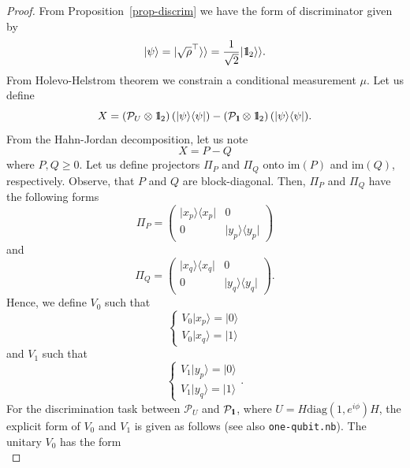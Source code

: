 \documentclass[preprint,12pt, a4paper]{elsarticle}
\newcommand{\ket}[1]{\ensuremath{|#1\rangle}}
\newcommand{\bra}[1]{\ensuremath{\langle#1|}}
\newcommand{\ketbra}[2]{\ensuremath{\ket{#1}\bra{#2}}}
\newcommand{\proj}[1]{\ensuremath{\ketbra{#1}{#1}}}
\newcommand{\1}{{\rm 1\hspace{-0.9mm}l}}
\newcommand{\Id}{{\rm 1\hspace{-0.9mm}l}}
\newcommand{\PP}{\mathcal{P}}
\newcommand{\diag}{\mathrm{diag}}
\begin{document}
\begin{proof}
From Proposition~\ref{prop-discrim} we have the form of discriminator given by
\begin{equation}
\ket{\psi} = | \sqrt{\rho}^\top \rangle \rangle = \frac{1}{\sqrt{2}} |\Id_2 
\rangle \rangle. 
\end{equation}
From Holevo-Helstrom theorem  we constrain a conditional measurement $\mu$.  
Let us define 
\begin{equation}
X  = \left( \PP_U \otimes \Id_2 \right)(\proj{\psi}) -  \left( \PP_\Id 
\otimes \Id_2 \right)(\proj{\psi}).
\end{equation} 
From the Hahn-Jordan decomposition, let us note
\begin{equation}
X = P - Q
\end{equation}
where $P, Q \ge 0 $. 
Let us define projectors $\Pi_P$ and $\Pi_Q$ onto  $\text{im}(P)$ and $\text{im}(Q)$, 
respectively. Observe, that $P $ and $Q$ are block-diagonal.  Then,  $\Pi_P$ and $\Pi_Q$ have the following forms
\begin{equation}
\Pi_P = \left(\begin{array}{cc}\proj{x_p}&0\\0&\proj{y_p}\end{array}\right) 
\end{equation}
and 
\begin{equation}
\Pi_Q = \left(\begin{array}{cc}\proj{x_q}&0\\0&\proj{y_q}\end{array}\right). 
\end{equation}
Hence, we define $V_0$ such that
\begin{equation}
\begin{cases} V_0 \ket{x_p} = \ket{0} \\ V_0 \ket{x_q} = \ket{1} \end{cases}
\end{equation}
and $V_1$ such that
\begin{equation}
\begin{cases} 
V_1 \ket{y_p} = \ket{0} \\ 
V_1 \ket{y_q} = \ket{1}
\end{cases}. 
\end{equation}
For the discrimination task between $\PP_{U}$ and $\PP_{\Id}$, where $U = H 
\diag(1, e^{i \phi })H$, the explicit form of $V_0$ and $V_1$ is given as 
follows (see also \texttt{one-qubit.nb}).
The unitary $V_0$ has the form
\begin{equation}

\end{equation}
\end{proof}
\end{document}
